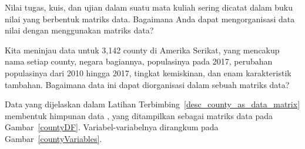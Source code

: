 \begin{exercisewrap}
\begin{nexercise}
Nilai tugas, kuis, dan ujian dalam suatu mata kuliah sering
dicatat dalam buku nilai yang berbentuk matriks data.
Bagaimana Anda dapat mengorganisasi data nilai dengan menggunakan
matriks data?\footnotemark
\end{nexercise}
\end{exercisewrap}


\begin{exercisewrap}
\begin{nexercise}\label{desc_county_as_data_matrix}%
Kita meninjau data untuk 3,142 county di Amerika Serikat,
yang mencakup nama setiap county,
negara bagiannya, populasinya pada 2017,
perubahan populasinya dari 2010 hingga 2017,
tingkat kemiskinan,
dan enam karakteristik tambahan.
Bagaimana data ini dapat diorganisasi dalam
sebuah matriks data?\footnotemark
\end{nexercise}
\end{exercisewrap}

Data yang dijelaskan dalam Latihan
Terbimbing~\ref{desc_county_as_data_matrix} membentuk himpunan data
, yang ditampilkan sebagai matriks data
pada Gambar~\ref{countyDF}.
Variabel-variabelnya dirangkum pada Gambar~\ref{countyVariables}.

